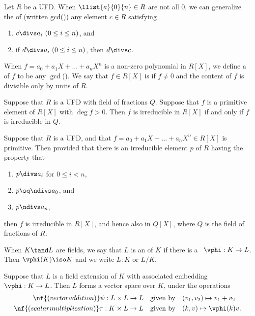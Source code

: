 \documentclass[a4paper]{article}
\begin{document}
\begin{tdefinition}
  Let $ R $ be a UFD.
  When $ \llist{a}{0}{n}\in R $ are not all 0, we can generalize the  of  (written gcd()) any element $ c\in R $ satisfying \begin{enumerate}[label=(\roman*)]
    \item $ c\divs a_i\ (0\leq i\leq n) $, and
    \item if $ d\divs a_i\ (0\leq i\leq n) $, then $ d\divs c $.
  \end{enumerate}
  When $ f=a_0+a_1X+\ldots +a_nX^n $ is a non-zero polynomial in $ R[X] $, we define a  of $ f $ to be any $ \gcd $().
  We say that $ f\in R[X] $ is  if $ f\neq 0 $ and the content of $ f $ is divisible only by units of $ R $.
\end{tdefinition}

\begin{tlemma}[Gauss]
  Suppose that $ R $ is a UFD with field of fractions $ Q $.
  Suppose that $ f $ is a primitive element of $ R[X] $ with $ \deg f > 0 $.
  Then $ f $ is irreducible in $ R[X] $ if and only if $ f $ is irreducible in $ Q $.
\end{tlemma}

\begin{ttheorem}
  Suppose that $ R $ is a UFD, and that $ f=a_0+a_1X+\ldots +a_nX^n \in R[X] $ is primitive.
  Then provided that there is an irreducible element $ p $ of $ R $ having the property that \begin{enumerate}[label=(\roman*)]
    \item $ p\divs a_i $ for $ 0\leq i < n $,
    \item $ p\sq \ndivs a_0 $, and
    \item $ p\ndivs a_n $,
  \end{enumerate}
  then $ f $ is irreducible in $ R[X] $, and hence also in $ Q[X] $, where $ Q $ is the field of fractions of $ R $.
\end{ttheorem}

\begin{tdefinition}
  When $ K \tand L $ are fields, we say that $L$ is an  of $K$ if there is a \homo~$\vphi: K \to L$.
  Then $ \vphi(K)\iso K $ and we write $ L:K $ or $ L/K $.
\end{tdefinition}

\quad Suppose that $L$ is a field extension of $K$ with associated embedding $\vphi: K \to L$.
  Then $L$ forms a vector space over $K$, under the operations \begin{align*}
    \nf{(vector addition) } \psi: L\times L &\to L \quad \text{given by} \quad (v_1,v_2) \mapsto v_1 + v_2 \\
    \nf{(scalar multiplication) } \tau : K\times  L &\to L \quad \text{given by} \quad (k,v) \mapsto \vphi(k)v.
  \end{align*}
\end{document}
